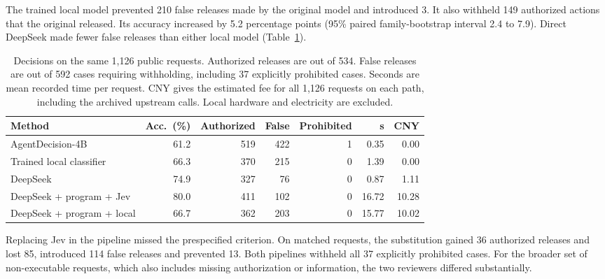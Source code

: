 The trained local model prevented 210 false releases made by the original model and introduced 3. It also withheld 149 authorized actions that the original released. Its accuracy increased by 5.2 percentage points (95\% paired family-bootstrap interval 2.4 to 7.9). Direct DeepSeek made fewer false releases than either local model (Table~\ref{tab:local-primary}).

\begin{table}[!htbp]\centering\small\setlength{\tabcolsep}{4pt}
\caption{Decisions on the same 1,126 public requests. Authorized releases are out of 534. False releases are out of 592 cases requiring withholding, including 37 explicitly prohibited cases. Seconds are mean recorded time per request. CNY gives the estimated fee for all 1,126 requests on each path, including the archived upstream calls. Local hardware and electricity are excluded.}
\label{tab:local-primary}\begin{tabular}{@{}lrrrrrr@{}}\toprule
Method & Acc.\ (\%) & Authorized & False & Prohibited & s & CNY \\ \midrule
AgentDecision-4B & 61.2 & 519 & 422 & 1 & 0.35 & 0.00 \\
Trained local classifier & 66.3 & 370 & 215 & 0 & 1.39 & 0.00 \\
DeepSeek & 74.9 & 327 & 76 & 0 & 0.87 & 1.11 \\
DeepSeek + program + Jev & 80.0 & 411 & 102 & 0 & 16.72 & 10.28 \\
DeepSeek + program + local & 66.7 & 362 & 203 & 0 & 15.77 & 10.02 \\
\bottomrule\end{tabular}\end{table}

Replacing Jev in the pipeline missed the prespecified criterion. On matched requests, the substitution gained 36 authorized releases and lost 85, introduced 114 false releases and prevented 13. Both pipelines withheld all 37 explicitly prohibited cases. For the broader set of non-executable requests, which also includes missing authorization or information, the two reviewers differed substantially.

